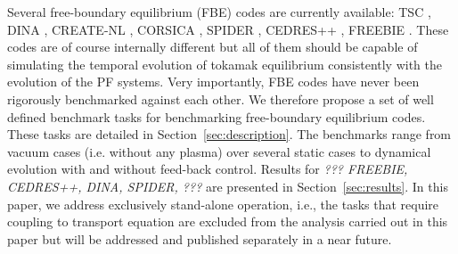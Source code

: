 Several free-boundary equilibrium (FBE) codes are currently available: TSC \cite{TSCref}, DINA \cite{DINA1993}, CREATE-NL \cite{CREATEref}, CORSICA \cite{CORSICAref}, SPIDER \cite{SPIDERref}, CEDRES++ \cite{CEDRESref}, FREEBIE \cite{FREEBIERef}. These codes are of course internally different but all of them should be capable of simulating the temporal evolution of tokamak equilibrium consistently with the evolution of the PF systems. Very importantly, FBE codes have never been rigorously benchmarked against each other. We therefore propose a set of well defined benchmark tasks for benchmarking free-boundary equilibrium codes. These tasks are detailed in Section~\ref{sec:description}. The benchmarks range from vacuum cases (i.e. without any plasma) over several static cases to dynamical evolution with and without feed-back control. Results for \emph{??? FREEBIE, CEDRES++, DINA, SPIDER, ???} are presented in Section~\ref{sec:results}. In this paper, we address exclusively stand-alone operation, i.e., the tasks that require coupling to transport equation are excluded from the analysis carried out in this paper but will be addressed and published separately in a near future.



